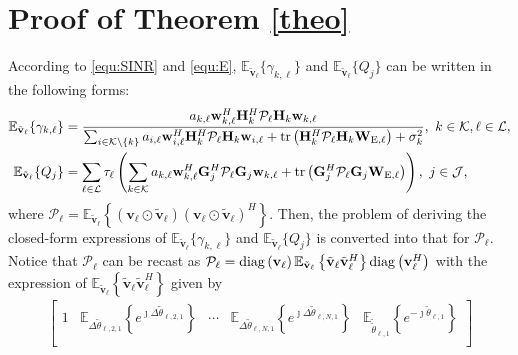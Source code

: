 \documentclass[12pt,draftclsnofoot, onecolumn]{IEEEtran}
\theoremstyle{plain}
\begin{document}
\begin{sloppypar}
\appendices
\section{Proof of Theorem \ref{theo}} \label{Appen_A}
According to \eqref{equ:SINR} and \eqref{equ:E}, $\mathbb E_{\tilde{\mathbf v}_\ell}\{ \gamma_{k,\ell}\}$ and $\mathbb E_{\tilde{\mathbf v}_\ell}\{ Q_j\}$ can be written in the following forms: 
{\addtolength{\jot}{5pt}
	\begin{align}
	\mathbb E_{\tilde{\mathbf v}_\ell}\{ \gamma_{k,\ell}\} & = \frac{a_{k,\ell}\mathbf w_{k,\ell}^H\mathbf H_k^H\mathcal P_\ell\mathbf H_k\mathbf w_{k,\ell}}{\sum_{i\in \mathcal K\backslash\{k\}}a_{i,\ell}\mathbf w_{i,\ell}^H\mathbf H_k^H\mathcal P_\ell\mathbf H_k\mathbf w_{i,\ell} + {\rm tr}\left(\mathbf H_k^H\mathcal P_\ell\mathbf H_k\mathbf W_{\mathrm E,\ell}\right)+ \sigma_k^2}, \  k\in\mathcal K, \ell\in\mathcal L, \label{expecta_SINR_orig}\\ 
	\mathbb E_{\tilde{\mathbf v}_\ell}\{ Q_j\} & = \sum_{\ell\in\mathcal L}\tau_\ell\left(\sum_{k\in\mathcal K}a_{k,\ell}\mathbf w_{k,\ell}^H\mathbf G_j^H\mathcal P_\ell\mathbf G_j\mathbf w_{k,\ell} + {\rm tr}\left(\mathbf G_j^H\mathcal P_\ell\mathbf G_j\mathbf W_{\mathrm E, \ell} \right) \right), \  j\in\mathcal J, \label{expecta_E_orig}
	\end{align}}%
where $\mathcal P_\ell = \mathbb E_{\tilde{\mathbf v}_\ell}\left\lbrace \left(\mathbf v_\ell\odot\tilde {\mathbf v}_\ell\right)\left(\mathbf v_\ell\odot\tilde {\mathbf v}_\ell\right)^H \right\rbrace$. Then, the problem of deriving the closed-form expressions of $\mathbb E_{\tilde{\mathbf v}_\ell}\{ \gamma_{k,\ell}\}$ and $\mathbb E_{\tilde{\mathbf v}_\ell}\{ Q_j\}$ is converted into that for $\mathcal P_\ell$. Notice that $\mathcal P_\ell$ can be recast as $\mathcal P_\ell = {\rm diag}\left(\mathbf v_\ell\right)\mathbb E_{\tilde{\mathbf v}_\ell}\left\lbrace\tilde{\mathbf v}_\ell\tilde{\mathbf v}_{\ell}^H\right\rbrace {\rm diag}\left(\mathbf v_{\ell}^H\right)$ with the expression of $\mathbb E_{\tilde{\mathbf v}_\ell}\left\lbrace\tilde{\mathbf v}_\ell\tilde{\mathbf v}_{\ell}^H\right\rbrace$ given by
\begin{align}\label{equ:matrix}
\begin{bmatrix}
1& \mathbb E_{\Delta\tilde{\theta}_{\ell,2,1}}\left\lbrace e^{\jmath\Delta\tilde{\theta}_{\ell,2,1}}\right\rbrace & \cdots & \mathbb E_{\Delta\tilde{\theta}_{\ell,N,1}}\left\lbrace e^{\jmath\Delta\tilde{\theta}_{\ell,N,1}}\right\rbrace  & \mathbb E_{\tilde\tilde{\theta}_{\ell,1}}\left\lbrace e^{-\jmath\tilde{\theta}_{\ell,1}}\right\rbrace \\

\end{bmatrix}
\end{align}
\end{sloppypar}
\end{document}
